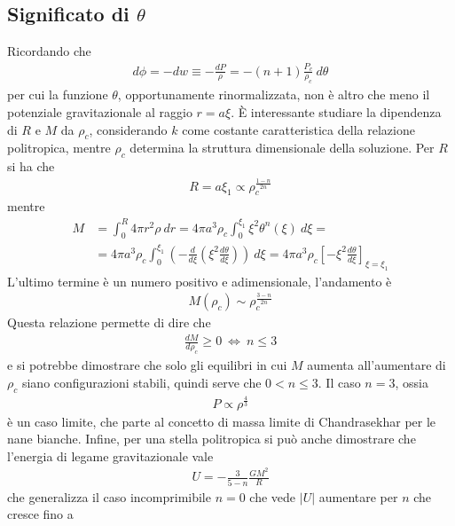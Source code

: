 \documentclass[a4paper, oneside]{book}
\begin{document}
\subsection{Significato di $\theta$}
Ricordando che 
\begin{gather*}
    d\phi = - dw \equiv -\frac{dP}{\rho} = -(n + 1)\frac{P_c}{\rho_c} \ d\theta
\end{gather*}
per cui la funzione $\theta$, opportunamente rinormalizzata, non è altro che 
meno il potenziale gravitazionale al raggio $r = a\xi$.  È interessante studiare la 
dipendenza di $R$ e $M$ da $\rho_c$, considerando $k$ come costante caratteristica della relazione 
politropica, mentre $\rho_c$ determina la struttura dimensionale della soluzione. Per $R$ si ha che 
\begin{gather*}
    R = a \xi_1 \propto \rho_c^{\frac{1 - n}{2n}}
\end{gather*}
mentre
\begin{align*}
    M &= \int_{0}^{R} 4\pi r^{2}\rho \ dr = 4\pi a^{3}\rho_c \int_{0}^{\xi_1} \xi^{2}\theta^{n}(\xi) \ d\xi = \\
    &= 4\pi a^{3} \rho_c \int_{0}^{\xi_1} \left(- \frac{d}{d\xi} \left(\xi^{2} \frac{d\theta}{d\xi}\right)\right)  \ d\xi = 4\pi a^{3}\rho_c \left[- \xi^{2} \frac{d\theta}{d\xi}\right]_{\xi = \xi_1}
\end{align*}
L'ultimo termine è un numero positivo e adimensionale, l'andamento è 
\begin{gather*}
    M(\rho_c) \sim \rho_c^{\frac{3 - n}{2n}}
\end{gather*}
Questa relazione permette di dire che 
\begin{gather*}
    \frac{dM}{d\rho_c} \geq 0 \ \Longleftrightarrow  \ n \leq 3
\end{gather*}
e si potrebbe dimostrare che solo gli equilibri in cui $M$ aumenta all'aumentare di $\rho_c$ siano 
configurazioni stabili, quindi serve che $0 < n \leq 3$. Il caso $n = 3$, ossia
\begin{gather*}
    P \propto \rho^{\frac{4}{3}}
\end{gather*}
è un caso limite, che parte al concetto di massa limite di Chandrasekhar per le nane bianche.
Infine, per una stella politropica si può anche dimostrare che l'energia di legame gravitazionale vale 
\begin{align}
    U = - \frac{3}{5 - n} \frac{GM^{2}}{R}
\end{align}
che generalizza il caso incomprimibile $n = 0$ che vede $\left| U \right|$ aumentare per $n$ che cresce fino a
\end{document}
